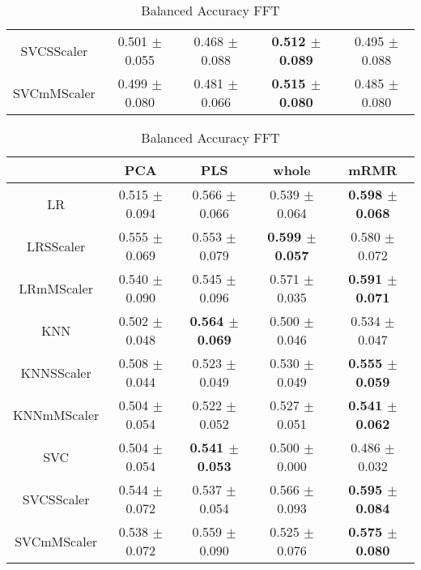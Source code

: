 \documentclass[]{report}
\begin{document}
\begin{table}
\begin{tabular}{c|cccc}
			 SVCSScaler  & 0.501 $\pm$ 0.055 & 0.468 $\pm$ 0.088 & \textbf{0.512 $\pm$ 0.089} & 0.495 $\pm$ 0.088 \\
			 SVCmMScaler & 0.499 $\pm$ 0.080 & 0.481 $\pm$ 0.066 & \textbf{0.515 $\pm$ 0.080} & 0.485 $\pm$ 0.080 \\
			\hline
		\end{tabular}
		\caption{\label{tab:bal_acc_DCOR} Balanced Accuracy DCOR}
		\vspace*{2cm}
		\begin{tabular}{c|cccc}
			\hline
			             & PCA             & PLS             & whole           & mRMR            \\
			\hline
			 LR          & 0.515 $\pm$ 0.094 & 0.566 $\pm$ 0.066 & 0.539 $\pm$ 0.064 & \textbf{0.598 $\pm$ 0.068} \\
			 LRSScaler   & 0.555 $\pm$ 0.069 & 0.553 $\pm$ 0.079 & \textbf{0.599 $\pm$ 0.057} & 0.580 $\pm$ 0.072 \\
			 LRmMScaler  & 0.540 $\pm$ 0.090 & 0.545 $\pm$ 0.096 & 0.571 $\pm$ 0.035 & \textbf{0.591 $\pm$ 0.071} \\
			 KNN         & 0.502 $\pm$ 0.048 & \textbf{0.564 $\pm$ 0.069} & 0.500 $\pm$ 0.046 & 0.534 $\pm$ 0.047 \\
			 KNNSScaler  & 0.508 $\pm$ 0.044 & 0.523 $\pm$ 0.049 & 0.530 $\pm$ 0.049 & \textbf{0.555 $\pm$ 0.059} \\
			 KNNmMScaler & 0.504 $\pm$ 0.054 & 0.522 $\pm$ 0.052 & 0.527 $\pm$ 0.051 & \textbf{0.541 $\pm$ 0.062} \\
			 SVC         & 0.504 $\pm$ 0.054 & \textbf{0.541 $\pm$ 0.053} & 0.500 $\pm$ 0.000 & 0.486 $\pm$ 0.032 \\
			 SVCSScaler  & 0.544 $\pm$ 0.072 & 0.537 $\pm$ 0.054 & 0.566 $\pm$ 0.093 & \textbf{0.595 $\pm$ 0.084} \\
			 SVCmMScaler & 0.538 $\pm$ 0.072 & 0.559 $\pm$ 0.090 & 0.525 $\pm$ 0.076 & \textbf{0.575 $\pm$ 0.080} \\
			\hline
		\end{tabular}
		\caption{\label{tab:bal_acc_FFT} Balanced Accuracy FFT}
		\vspace*{2cm}
	\end{table}
\end{document}
